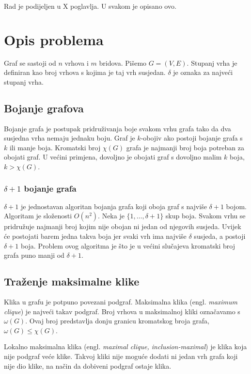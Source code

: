 \documentclass[diplomskirad]{fer}
\begin{document}
Rad je podijeljen u X poglavlja. U svakom je opisano ovo.

\chapter{Opis problema}
\label{opis_problema}

Graf se sastoji od $n$ vrhova i $m$ bridova. Pišemo $G = (V, E)$. Stupanj vrha je definiran kao broj vrhova s kojima je taj vrh susjedan. $\delta$ je
oznaka za najveći stupanj vrha.

\section{Bojanje grafova}
Bojanje grafa je postupak pridruživanja boje svakom vrhu grafa tako da dva susjedna vrha nemaju jednaku boju. Graf je $k$-obojiv ako postoji
bojanje grafa s $k$ ili manje boja. Kromatski broj $\chi(G)$ grafa je najmanji broj boja potreban za obojati graf. U većini primjena,
dovoljno je obojati graf s dovoljno malim $k$ boja, $k > \chi(G)$.

\subsection{$\delta + 1$ bojanje grafa}
\label{delta1}
$\delta + 1$ je jednostavan algoritan bojanja grafa koji oboja graf s najviše $\delta + 1$ bojom. Algoritam je složenosti $O(n^2)$.
Neka je $\{1, \dots, \delta + 1\}$ skup boja. Svakom vrhu se pridružuje najmanji broj kojim nije obojan ni jedan od njegovih susjeda. Uvijek će postojati
barem jedna takva boja jer svaki vrh ima najviše $\delta$ susjeda, a postoji $\delta + 1$ boja. Problem ovog algoritma je što je u većini slučajeva 
kromatski broj grafa puno manji od $\delta + 1$.

\section{Traženje maksimalne klike}
Klika u grafu je potpuno povezani podgraf. Maksimalna klika (engl. \textit{maximum clique}) je najveći takav podgraf. Broj vrhova u maksimalnoj kliki označavamo s $\omega(G)$.
Ovaj broj predstavlja donju granicu kromatskog broja grafa, $\omega(G) \leq \chi(G)$.

Lokalno maksimalna klika (engl. \textit{maximal clique, inclusion-maximal}) je klika koja nije podgraf veće klike. Takvoj kliki nije moguće dodati ni jedan
vrh grafa koji nije dio klike, na način da dobiveni podgraf ostaje klika.
\end{document}
